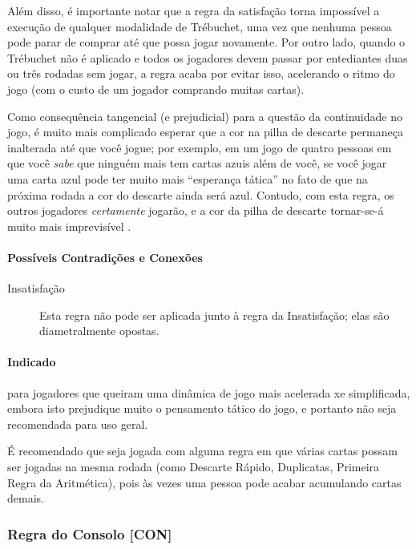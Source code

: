 Além disso, é importante notar que a regra da satisfação torna impossível a execução de qualquer modalidade de Trébuchet, uma vez que nenhuma pessoa pode parar de comprar até que possa jogar novamente. Por outro lado, quando o Trébuchet não é aplicado e todos os jogadores devem passar por entediantes duas ou três rodadas sem jogar, a regra acaba por evitar isso, acelerando o ritmo do jogo (com o custo de um jogador comprando muitas cartas).

Como consequência tangencial (e prejudicial) para a questão da continuidade no jogo, é muito mais complicado esperar que a cor na pilha de descarte permaneça inalterada até que você jogue; por exemplo, em um jogo de quatro pessoas em que você \emph{sabe} que ninguém mais tem cartas azuis além de você, se você jogar uma carta azul pode ter muito mais ``esperança tática'' no fato de que na próxima rodada a cor do descarte ainda será azul. Contudo, com esta regra, os outros jogadores \emph{certamente} jogarão, e a cor da pilha de descarte tornar-se-á muito mais imprevisível .

\paragraph{Possíveis Contradições e Conexões}

\begin{description}
\item[Insatisfação]{Esta regra não pode ser aplicada junto à regra da Insatisfação; elas são diametralmente opostas.}
\end{description}

\paragraph{Indicado} 

para jogadores que queiram uma dinâmica de jogo mais acelerada xe simplificada, embora isto prejudique muito o pensamento tático do jogo, e portanto não seja recomendada para uso geral.

É recomendado que seja jogada com alguma regra em que várias cartas possam ser jogadas na mesma rodada (como Descarte Rápido, Duplicatas, Primeira Regra da Aritmética), pois às vezes uma pessoa pode acabar acumulando cartas demais. 

\subsubsection{Regra do Consolo [CON]}

